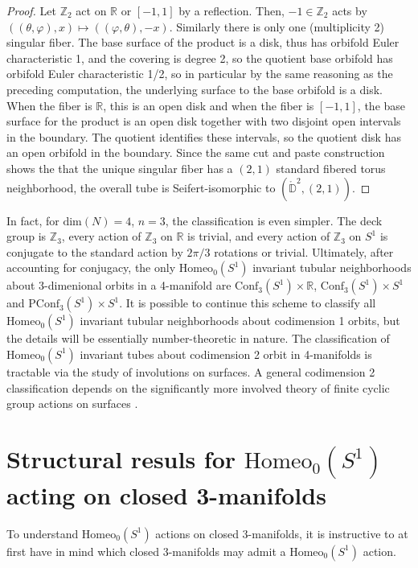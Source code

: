 \documentclass[10pt, oneside]{article}
\newcommand{\R}{\mathbb{R}}
\newcommand{\Z}{\mathbb{Z}}
\newcommand{\homeo}[1][S^1]{\text{Homeo}_0(#1)}
\newcommand{\conf}[2][S^1]{\text{Conf}_{#2}(#1)}
\newcommand{\pconf}[2][S^1]{\text{PConf}_{#2}(#1)}
\theoremstyle{definition}
\theoremstyle{definition}
\begin{document}
\begin{proof}
    Let $\Z_2$ act on $\R$ or $[-1, 1]$ by a reflection. Then, $-1\in\Z_2$ acts by $((\theta, \varphi), x)\mapsto ((\varphi, \theta), -x)$. Similarly there is only one (multiplicity 2) singular fiber. The base surface of the product is a disk, thus has orbifold Euler characteristic 1, and the covering is degree 2, so the quotient base orbifold has orbifold Euler characteristic 1/2, so in particular by the same reasoning as the preceding computation, the underlying surface to the base orbifold is a disk. When the fiber is $\R$, this is an open disk and when the fiber is $[-1,1]$, the base surface for the product is an open disk together with two disjoint open intervals in the boundary. The quotient identifies these intervals, so the quotient disk has an open orbifold in the boundary. Since the same cut and paste construction shows the that the unique singular fiber has a $(2,1)$ standard fibered torus neighborhood, the overall tube is Seifert-isomorphic to $(\mathring{\mathbb{D}}^2, (2, 1))$.
\end{proof}

 In fact, for $\text{dim}(N) = 4$, $n=3$, the classification is even simpler. The deck group is $\Z_3$, every action of $\Z_3$ on $\R$ is trivial, and every action of $\Z_3$ on $S^1$ is conjugate to the standard action by $2\pi/3$ rotations or trivial. Ultimately, after accounting for conjugacy, the only $\homeo$ invariant tubular neighborhoods about 3-dimenional orbits in a 4-manifold are $\conf[S^1]{3}\times \R$, $\conf[S^1]{3}\times S^1$ and $\pconf[S^1]{3}\times S^1$. It is possible to continue this scheme to classify all $\homeo$ invariant tubular neighborhoods about codimension 1 orbits, but the details will be essentially number-theoretic in nature. The classification of $\homeo$ invariant tubes about codimension 2 orbit in 4-manifolds is tractable via the study of involutions on surfaces\cite{dugger:InvolutionsSurfaces}. A general codimension 2 classification depends on the significantly more involved theory of finite cyclic group actions on surfaces \cite{harvey:CyclicGroups}\cite{ding:ClassificationCyclic}.


\section{Structural resuls for \texorpdfstring{$\homeo$}{Homeo\_0(S\string^1)} acting on closed 3-manifolds}\label{sec:homeos1}

To understand $\homeo$ actions on closed 3-manifolds, it is instructive to at first have in mind which closed 3-manifolds may admit a $\homeo$ action.
\end{document}
